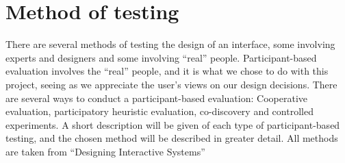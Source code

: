 \section{Method of testing}
There are several methods of testing the design of an interface, some involving experts and designers and some involving ``real'' people. Participant-based evaluation involves the ``real'' people, and it is what we chose to do with this project, seeing as we appreciate the user's views on our design decisions. There are several ways to conduct a participant-based evaluation: Cooperative evaluation, participatory heuristic evaluation, co-discovery and controlled experiments. A short description will be given of each type of participant-based testing, and the chosen method will be described in greater detail.
All methods are taken from ``Designing Interactive Systems''\cite{Benyon10}



